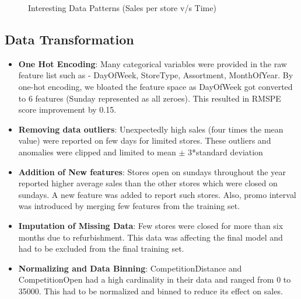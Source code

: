 \documentclass[12pt,a4paper]{article}
\begin{document}
\begin{itemize}
	      \begin{figure}[H]
	      	\centering
	      	\caption{Interesting Data Patterns (Sales per store v/s Time)}
	      	\label{fig:dataanalysis2}		
	      \end{figure}
	      		    
\end{itemize}
    
    
    
    
\subsection{Data Transformation}
\label{dt}
\begin{itemize}
	
	\item \textbf{One Hot Encoding}: Many categorical variables were provided in the raw feature list such as - DayOfWeek, StoreType, Assortment, MonthOfYear. By one-hot encoding, we bloated the feature space as DayOfWeek got converted to 6 features (Sunday represented as all zeroes). This resulted in RMSPE score improvement by 0.15.
	      
	\item \textbf{Removing data outliers}: Unexpectedly high sales (four times the mean value) were reported on few days for limited stores. These outliers and anomalies were clipped and limited to mean $ \pm $ 3*standard deviation
	      
	\item \textbf{Addition of New features}: Stores open on sundays throughout the year reported higher average sales than the other stores which were closed on sundays. A new feature was added to report such stores. Also, promo interval was introduced by merging few features from the training set.
	      
	\item \textbf{Imputation of Missing Data}: Few stores were closed for more than six months due to refurbishment. This data was affecting the final model and had to be excluded from the final training set. 
	      
	\item \textbf{Normalizing and Data Binning}: CompetitionDistance and CompetitionOpen had a high cardinality in their data and ranged from 0 to 35000. This had to be normalized and binned to reduce its effect on sales.
\end{itemize}
\end{document}
